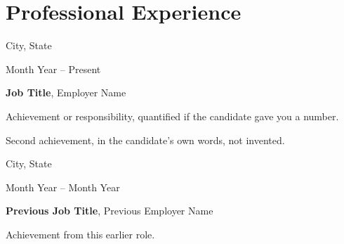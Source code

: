 \vspace{-0.2 cm}
\section{Professional Experience}

\begin{twocolentry}{
    City, State

    Month Year -- Present
}
    \textbf{Job Title}, Employer Name

\begin{highlights}
    \item Achievement or responsibility, quantified if the candidate gave you a number.
    \item Second achievement, in the candidate's own words, not invented.
\end{highlights}
\end{twocolentry}

\vspace{0.2 cm}
\begin{twocolentry}{
    City, State

    Month Year -- Month Year
}
    \textbf{Previous Job Title}, Previous Employer Name

\begin{highlights}
    \item Achievement from this earlier role.
\end{highlights}
\end{twocolentry}
